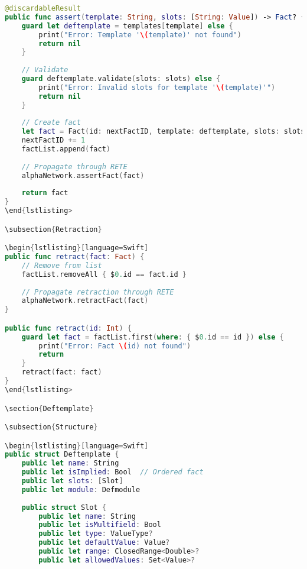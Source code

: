 \begin{lstlisting}[language=Swift]
@discardableResult
public func assert(template: String, slots: [String: Value]) -> Fact? {
    guard let deftemplate = templates[template] else {
        print("Error: Template '\(template)' not found")
        return nil
    }
    
    // Validate
    guard deftemplate.validate(slots: slots) else {
        print("Error: Invalid slots for template '\(template)'")
        return nil
    }
    
    // Create fact
    let fact = Fact(id: nextFactID, template: deftemplate, slots: slots)
    nextFactID += 1
    factList.append(fact)
    
    // Propagate through RETE
    alphaNetwork.assertFact(fact)
    
    return fact
}
\end{lstlisting>

\subsection{Retraction}

\begin{lstlisting}[language=Swift]
public func retract(fact: Fact) {
    // Remove from list
    factList.removeAll { $0.id == fact.id }
    
    // Propagate retraction through RETE
    alphaNetwork.retractFact(fact)
}

public func retract(id: Int) {
    guard let fact = factList.first(where: { $0.id == id }) else {
        print("Error: Fact \(id) not found")
        return
    }
    retract(fact: fact)
}
\end{lstlisting>

\section{Deftemplate}

\subsection{Structure}

\begin{lstlisting}[language=Swift]
public struct Deftemplate {
    public let name: String
    public let isImplied: Bool  // Ordered fact
    public let slots: [Slot]
    public let module: Defmodule
    
    public struct Slot {
        public let name: String
        public let isMultifield: Bool
        public let type: ValueType?
        public let defaultValue: Value?
        public let range: ClosedRange<Double>?
        public let allowedValues: Set<Value>?
        

\end{lstlisting}
